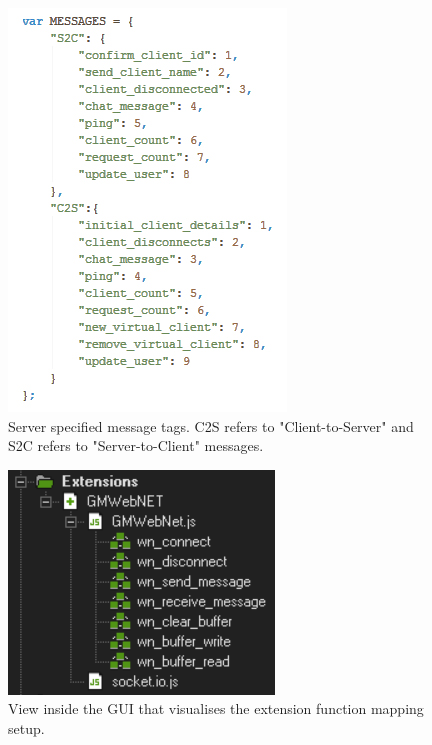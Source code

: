 \documentclass[bsc, 12pt, twoside, singlespacing, parskip, abbrevs, notimes, normalheadings, logo]{styles/infthesis}
\begin{document}
\begin{figure}
\includegraphics[scale=0.75]{images/server_message_tags.jpg}
\caption{Server specified message tags. C2S refers to "Client-to-Server" and S2C refers to "Server-to-Client" messages.}
\label{fig:server_message_tags}
\vspace{1em}
\end{figure}

\begin{figure}
\centering
\includegraphics[scale=1.2]{images/extensions_folder.png}
\caption{View inside the GUI that visualises the extension function mapping setup.}
\label{fig:extension_folder}
\vspace{1em}
\end{figure}
\end{document}
